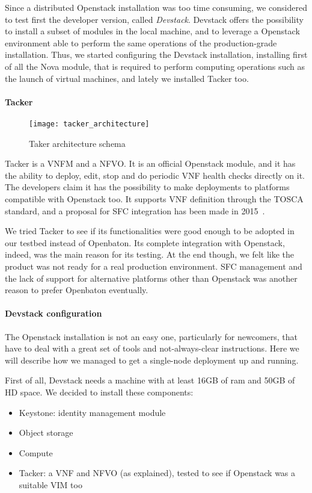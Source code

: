 Since a distributed Openstack installation was too time consuming, we considered
to test first the developer version, called \emph{Devstack}. Devstack offers the
possibility to install a subset of modules in the local machine, and to leverage
a Openstack environment able to perform the same operations of the
production-grade installation. Thus, we started configuring the Devstack
installation, installing first of all the Nova module, that is required to
perform computing operations such as the launch of virtual machines, and lately
we installed Tacker too.

\paragraph*{Tacker}
\begin{figure}[t]
  \centering
  \texttt{[image: tacker\_architecture]}
  \caption[Taker architecture schema]{Taker architecture
    schema~\cite{tackerOpenstackwiki}}
\end{figure}
Tacker is a VNFM and a NFVO. It is an official Openstack module, and it has the
ability to deploy, edit, stop and do periodic VNF health checks directly on it.
The developers claim it has the possibility to make deployments to platforms
compatible with Openstack too. It supports VNF definition through the TOSCA
standard, and a proposal for SFC integration has been made in
2015~\cite{tackerOpenstackwiki}.

We tried Tacker to see if its functionalities were good enough to be adopted in
our testbed instead of Openbaton. Its complete integration with Openstack,
indeed, was the main reason for its testing. At the end though, we felt like the
product was not ready for a real production environment. SFC management and the
lack of support for alternative platforms other than Openstack was another
reason to prefer Openbaton eventually.

\paragraph*{Devstack configuration}
The Openstack installation is not an easy one, particularly for newcomers, that 
have to deal with a great set of tools and not-always-clear instructions. Here 
we will describe how we managed to get a single-node deployment up and running.

First of all, Devstack needs a machine with at least 16GB of ram and 50GB of HD
space. We decided to install these components:
\begin{itemize}
 \item Keystone: identity management module
 \item Object storage
 \item Compute
 \item Tacker: a VNF and NFVO (as explained), tested to see if Openstack was a
   suitable VIM too
\end{itemize}


